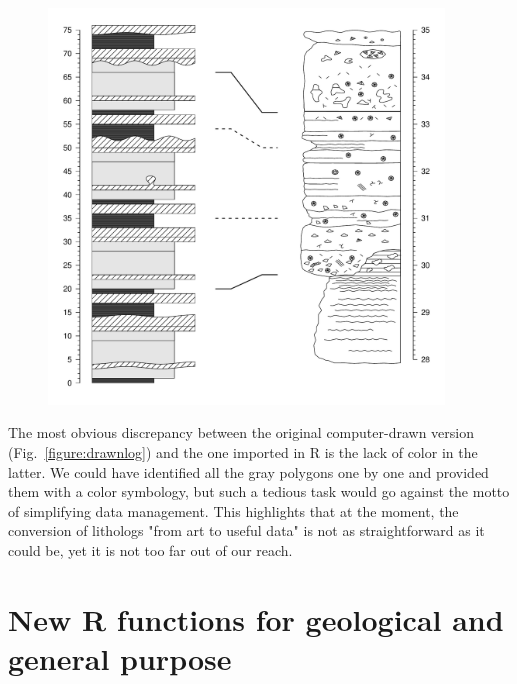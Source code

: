
\begin{figure}[H]
	\centering
	\includegraphics[width=105mm]{Log Correlation}
\end{figure}

 The most obvious discrepancy between the original computer-drawn version (Fig.~\ref{figure:drawnlog}) and the one imported in R is the lack of color in the latter. We could have identified all the gray polygons one by one and provided them with a color symbology, but such a tedious task would go against the motto of simplifying data management. This highlights that at the moment, the conversion of lithologs "from art to useful data" is not as straightforward as it could be, yet it is not too far out of our reach. 

\section{New R functions for geological and general purpose}

